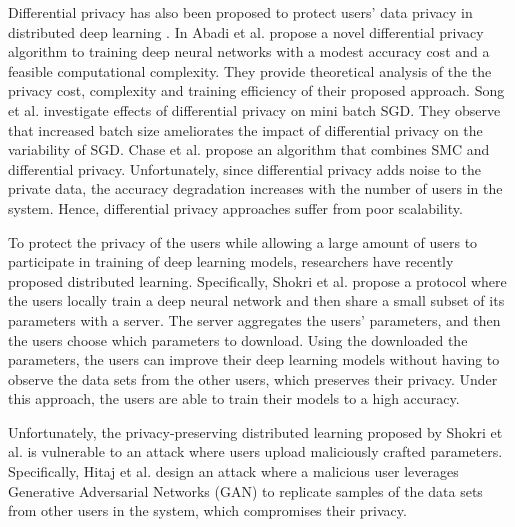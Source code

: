 \documentclass[letterpaper]{article}
\begin{document}
\begin{flushleft}
{Differential privacy has also been proposed to protect users' data privacy  in distributed deep learning
\cite{vepakomma2018no}. 
In Abadi et al. \cite{abadi2016deep} propose a novel differential privacy algorithm to training deep neural networks with a modest
accuracy cost and a feasible computational complexity. They provide theoretical analysis of the the privacy cost, complexity and
training efficiency of their proposed approach. 
Song et al. \cite{song2013stochastic} investigate effects of differential privacy on mini batch SGD. They observe that increased batch
size ameliorates the impact of differential privacy on the variability of SGD. 
Chase et al. \cite{chase2017private} propose an algorithm that combines  SMC and differential privacy. 
Unfortunately, since differential privacy adds noise to the private data, the accuracy degradation increases with the number of users
in the system. Hence, differential privacy approaches suffer from poor scalability. 

To protect the privacy of the users while allowing a large amount of users to participate in training of deep learning
models, researchers have recently proposed distributed learning. Specifically, Shokri et al. \cite{shokri2015privacy} propose 
a protocol where the users locally train a deep neural network and then share a small subset of its parameters
with a server. The server aggregates the users' parameters, and then the users choose which parameters to download. 
Using the downloaded the parameters, the users can improve their deep learning models without having to observe the data sets from the
other users, which preserves their privacy. Under this approach, the users are able to train their models to a high accuracy. 

Unfortunately, the privacy-preserving distributed learning proposed by Shokri et al. \cite{shokri2015privacy} is vulnerable to an
attack where users upload maliciously crafted parameters. Specifically, Hitaj  et al. \cite{hitaj2017deep} design
an attack where a malicious user 
leverages Generative Adversarial Networks (GAN) to replicate samples of the data sets from other users in the system, which compromises
their privacy. 



}
\end{flushleft}
\end{document}
